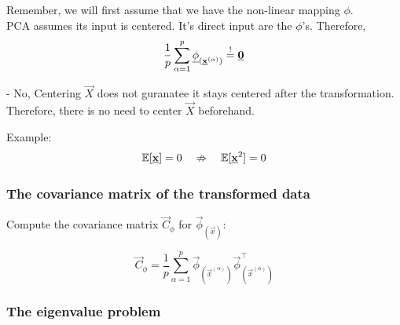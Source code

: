 \begin{frame}{\subsubsecname}

Remember, we will first assume that we have the non-linear mapping $\phi$.\\

PCA assumes its input is centered.
It's direct input are the $\phi$'s. Therefore,
\begin{equation}
\frac{1}{p} \sum^{p}_{\alpha=1} \underline{\mathbf{\phi}}_{(\underline{\mathbf{x}}^{(\alpha)})} \stackrel{\mathrm{!}}{=} \underline{\mathbf{0}}
\end{equation}


\pause

- No, Centering $\vec X$ does not guranatee it stays centered after the transformation.
Therefore, there is no need to center $\vec X$ beforehand.

Example:
\begin{equation}
\mathbb{E}[\underline{\mathbf{x}}] = 0 \quad \nRightarrow \quad \mathbb{E}[\underline{\mathbf{x}}^2] = 0
\end{equation}

\end{frame}

\subsubsection{The covariance matrix of the transformed data}

\begin{frame}{\subsubsecname}

Compute the covariance matrix $\vec C_{\phi}$ for $\vec{\phi}_{(\vec{x})}$:


\begin{equation} \label{eq:cov}
\vec C_{\phi} = \frac{1}{p} \sum_{\alpha=1}^{p} \vec{\phi}_{(\vec{x}^{(\alpha)})} \vec{\phi}^{\top}_{(\vec{x}^{(\alpha)})}
\end{equation}

\end{frame}

\subsubsection{The eigenvalue problem}

